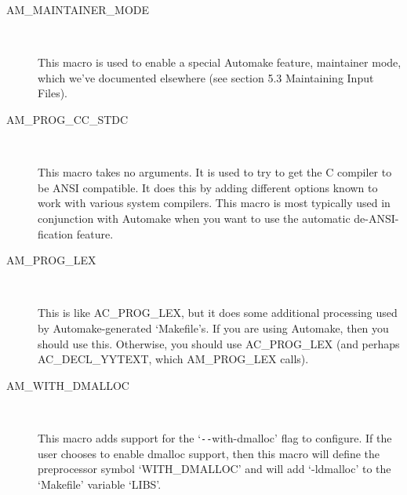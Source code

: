 \begin{description}
\item[AM\_{}MAINTAINER\_{}MODE]
\

    This macro is used to enable a special Automake feature, maintainer mode, which we've documented elsewhere (see section 5.3 Maintaining Input Files).

\item[AM\_{}PROG\_{}CC\_{}STDC]
\

    This macro takes no arguments. It is used to try to get the C compiler to be ANSI compatible. It does this by adding different options known to work with various system compilers. This macro is most typically used in conjunction with Automake when you want to use the automatic de-ANSI-fication feature.

\item[AM\_{}PROG\_{}LEX]
\

    This is like AC\_{}PROG\_{}LEX, but it does some additional processing used by Automake-generated `Makefile's. If you are using Automake, then you should use this. Otherwise, you should use AC\_{}PROG\_{}LEX (and perhaps AC\_{}DECL\_{}YYTEXT, which AM\_{}PROG\_{}LEX calls).

\item[AM\_{}WITH\_{}DMALLOC]
\

    This macro adds support for the `\verb+--+with-dmalloc' flag to configure. If the user chooses to enable dmalloc support, then this macro will define the preprocessor symbol `WITH\_{}DMALLOC' and will add `-ldmalloc' to the `Makefile' variable `LIBS'.
\end{description}
